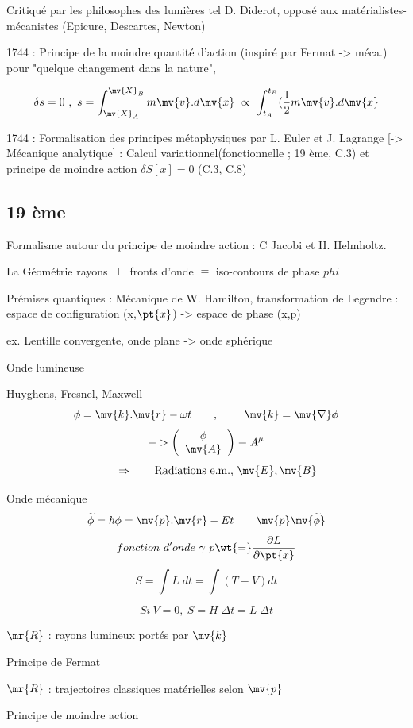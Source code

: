 Critiqué par les philosophes des lumières tel D. Diderot, opposé aux matérialistes-mécanistes (Epicure, Descartes, Newton)

1744 : Principe de la moindre quantité d'action (inspiré par Fermat -> méca.) pour "quelque changement dans la nature",

\[
\delta s=0\ ,\ s=\int^{\mv{X}_B}_{\mv{X}_A}m\mv{v}.d\mv{x}\ \propto\ 
\int^{t_B}_{t_A}(\frac{1}{2}m\mv{v}.d\mv{x}
\]

1744 : Formalisation des principes métaphysiques par L. Euler et J. Lagrange [-> Mécanique analytique] : Calcul variationnel(fonctionnelle ; 19 ème, C.3) et principe de moindre action $\delta S[x]=0$ (C.3, C.8)
\subsection{19 ème}
Formalisme autour du principe de moindre action : C Jacobi et H. Helmholtz.

La Géométrie rayons $\perp$ fronts d'onde $\equiv$ iso-contours de phase $phi$

Prémises quantiques : Mécanique de W. Hamilton, transformation de Legendre : espace de configuration (x,$\pt{x}$) -> espace de phase (x,p)

ex. Lentille convergente, onde plane -> onde sphérique \\

\begin{minipage}[c]{.45\linewidth}
Onde lumineuse

Huyghens, Fresnel, Maxwell
\[\phi=\mv{k}.\mv{r}-\omega t\qquad,\qquad\ \mv{k}=\mv{\nabla}\phi\]
\[-> \left(
\begin{array}{ c }
 \phi \\ 
 \mv{A} \\ %
\end{array}\right)
\equiv A^\mu
\]
\[
 \qquad \Rightarrow \qquad \text{Radiations e.m., }\mv{E},\mv{B}
\]
\end{minipage}
\hfill
\begin{minipage}[c]{.45\linewidth}
Onde mécanique 
\[
\widetilde{\phi}=\hbar\phi=\mv{p}.\mv{r}-Et \qquad \mv{p}\mv{\widetilde{\phi}}
\]
\[
fonction\ d'onde\ \gamma\ p\wt{=}\frac{\partial L}{\partial\pt{x}}
\]
\[
S=\int L\;dt=\int(T-V)dt
\]

\[
Si\ V=0,\ S=H\;\Delta t=L\;\Delta t
\]
\end{minipage}
\begin{minipage}[c]{.45\linewidth}
$\mr{R}$ : rayons lumineux portés par $\mv{k}$

Principe de Fermat
\end{minipage}
\hfill
\begin{minipage}[c]{.5\linewidth}
$\mr{R}$ : trajectoires classiques matérielles selon $\mv{p}$

Principe de moindre action
\end{minipage}
